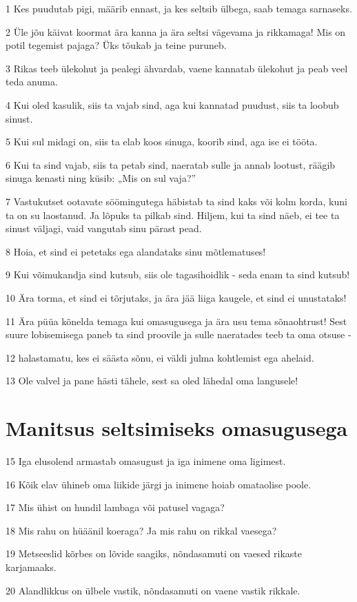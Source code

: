 \par 1 Kes puudutab pigi, määrib ennast, ja kes seltsib ülbega, saab temaga sarnaseks.
\par 2 Üle jõu käivat koormat ära kanna ja ära seltsi vägevama ja rikkamaga! Mis on potil tegemist pajaga? Üks tõukab ja teine puruneb.
\par 3 Rikas teeb ülekohut ja pealegi ähvardab, vaene kannatab ülekohut ja peab veel teda anuma.
\par 4 Kui oled kasulik, siis ta vajab sind, aga kui kannatad puudust, siis ta loobub sinust.
\par 5 Kui sul midagi on, siis ta elab koos sinuga, koorib sind, aga ise ei tööta.
\par 6 Kui ta sind vajab, siis ta petab sind, naeratab sulle ja annab lootust, räägib sinuga kenasti ning küsib: „Mis on sul vaja?”
\par 7 Vastukutset ootavate söömingutega häbistab ta sind kaks või kolm korda, kuni ta on su laostanud. Ja lõpuks ta pilkab sind. Hiljem, kui ta sind näeb, ei tee ta sinust väljagi, vaid vangutab sinu pärast pead.
\par 8 Hoia, et sind ei petetaks ega alandataks sinu mõtlematuses!
\par 9 Kui võimukandja sind kutsub, siis ole tagasihoidlik - seda enam ta sind kutsub!
\par 10 Ära torma, et sind ei tõrjutaks, ja ära jää liiga kaugele, et sind ei unustataks!
\par 11 Ära püüa kõnelda temaga kui omasugusega ja ära usu tema sõnaohtrust! Sest suure lobisemisega paneb ta sind proovile ja sulle naeratades teeb ta oma otsuse -
\par 12 halastamatu, kes ei säästa sõnu, ei väldi julma kohtlemist ega ahelaid.
\par 13 Ole valvel ja pane hästi tähele, sest sa oled lähedal oma langusele!

\section*{Manitsus seltsimiseks omasugusega}

\par 15 Iga elusolend armastab omasugust ja iga inimene oma ligimest.
\par 16 Kõik elav ühineb oma liikide järgi ja inimene hoiab omataolise poole.
\par 17 Mis ühist on hundil lambaga või patusel vagaga?
\par 18 Mis rahu on hüäänil koeraga? Ja mis rahu on rikkal vaesega?
\par 19 Metseeslid kõrbes on lõvide saagiks, nõndasamuti on vaesed rikaste karjamaaks.
\par 20 Alandlikkus on ülbele vastik, nõndasamuti on vaene vastik rikkale.

